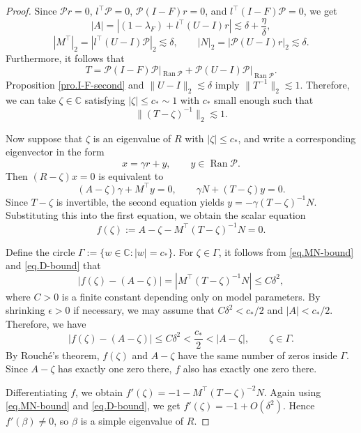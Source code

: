 \documentclass[11pt,twoside, a4paper]{article}
\numberwithin{equation}{section}
\numberwithin{figure}{section}
\theoremstyle{plain} %
\theoremstyle{definition}
\theoremstyle{remark}
\newcommand{\1} {\mspace{1 mu}}
\newcommand{\2} {\mspace{2 mu}}
\newcommand{\C} {{\mathbb{C}}}
\DeclareMathOperator{\Ran}{Ran}
\begin{document}
\begin{proof}
Since $\mathcal{P}r=0$, $l^\top \mathcal{P}=0$, $\mathcal{P}(I-F)r=0$, and $l^\top(I-F)\mathcal{P}=0$, we get
\[
|A|=|(1-\lambda_F)+l^\top(U-I)r|\lesssim\delta+\frac{\eta}{\delta},
\]
\begin{equation}\label{eq.MN-bound}
  |M^\top|_2=|l^\top(U-I)\mathcal{P}|_2\lesssim\delta,\qquad |N|_2=|\mathcal{P}(U-I)r|_2\lesssim\delta.
\end{equation}
Furthermore, it follows that
\[
T=\mathcal{P}(I-F)\mathcal{P}|_{\Ran \mathcal{P}}+\mathcal{P}(U-I)\mathcal{P}|_{\Ran \mathcal{P}}.
\]
Proposition \ref{pro.I-F-second} and $\|U-I\|_2\lesssim \delta$ imply $\|T^{-1}\|_2\lesssim 1$.
Therefore, we can take $\zeta\in\C$ satisfying $|\zeta|\le c_*\sim 1$ with $c_*$ small enough such that
\begin{equation}\label{eq.D-bound}
  \|(T-\zeta)^{-1}\|_2\lesssim 1.
\end{equation}


Now suppose that $\zeta$ is an eigenvalue of $R$ with $|\zeta|\le c_*$, and write a corresponding eigenvector in the form
\[
x=\gamma r+y,\qquad y\in \Ran \mathcal{P}.
\]
Then $(R-\zeta)x=0$ is equivalent to
\[
(A-\zeta)\gamma+M^\top y=0,
\qquad
\gamma N+(T-\zeta) y=0.
\]
Since $T-\zeta$ is invertible, the second equation yields
$
y=-\gamma(T-\zeta)^{-1}N.
$
Substituting this into the first equation, we obtain the scalar equation
\[
f(\zeta):=A-\zeta-M^\top(T-\zeta)^{-1}N=0.
\]


Define the circle
$
\Gamma:=\{w\in\C: |w|=c_*\}.
$
For $\zeta\in \Gamma$, it follows from \eqref{eq.MN-bound} and \eqref{eq.D-bound} that
\[
|f(\zeta)-(A-\zeta)|=|M^\top(T-\zeta)^{-1}N|\le  C\delta^2,
\]
where $C>0$ is a finite constant depending only on model parameters. By shrinking $\epsilon>0$ if necessary, we may assume that $C\delta^2<c_*/2$ and $|A|<c_*/2$.
Therefore,  we have 
\[
|f(\zeta)-(A-\zeta)|\le  C\delta^2<\frac{c_*}{2}<|A-\zeta|,\qquad\zeta\in\Gamma.
\]
By Rouch\'e's theorem, $f(\zeta)$ and $A-\zeta$ have the same number of zeros inside $\Gamma$. Since $A-\zeta$ has exactly one zero there, $f$ also has exactly one zero there. 

Differentiating $f$, we obtain
$
f'(\zeta)=-1-M^\top (T-\zeta)^{-2}N.
$
Again using \eqref{eq.MN-bound} and \eqref{eq.D-bound}, we get
$
f'(\zeta)=-1+O(\delta^2).
$
Hence $f'(\beta)\neq 0$, so $\beta$ is a simple eigenvalue of $R$.





 



\end{proof}
\end{document}
